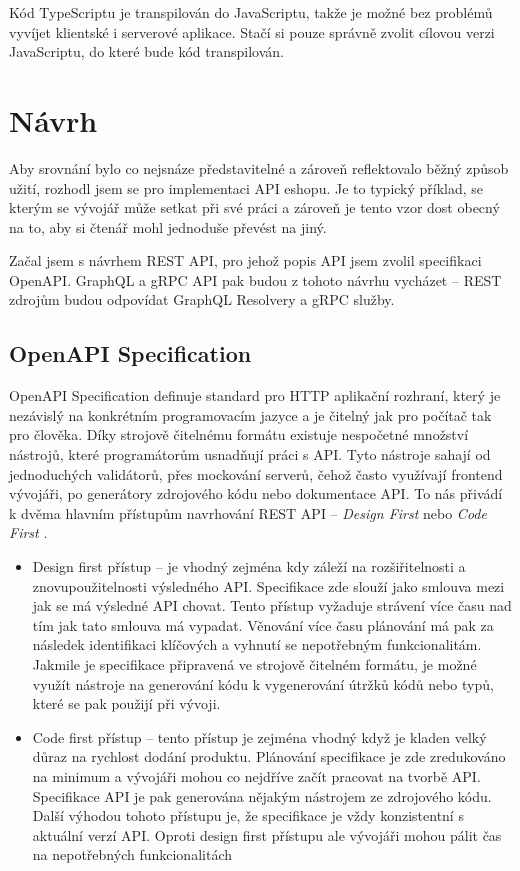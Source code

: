 \documentclass[thesis=M,czech]{FITthesis}[2019/12/23]
\begin{document}
Kód TypeScriptu je transpilován do JavaScriptu, takže je možné bez problémů vyvíjet klientské i serverové aplikace. Stačí si pouze správně zvolit cílovou verzi JavaScriptu, do které bude kód transpilován.

\chapter{Návrh}
Aby srovnání bylo co nejsnáze představitelné a zároveň reflektovalo běžný způsob užití, rozhodl jsem se pro implementaci API eshopu. Je to typický příklad, se kterým se vývojář může setkat při své práci a zároveň je tento vzor dost obecný na to, aby si čtenář mohl jednoduše převést na jiný. 

Začal jsem s návrhem REST API, pro jehož popis API jsem zvolil specifikaci OpenAPI. GraphQL a gRPC API pak budou z tohoto návrhu vycházet -- REST zdrojům budou odpovídat GraphQL Resolvery a gRPC služby.

\section{OpenAPI Specification}
OpenAPI Specification definuje standard pro HTTP aplikační rozhraní, který je nezávislý na konkrétním programovacím jazyce a je čitelný jak pro počítač tak pro člověka.
Díky strojově čitelnému formátu existuje nespočetné množství nástrojů, které programátorům usnadňují práci s API. Tyto nástroje sahají od jednoduchých validátorů, přes mockování serverů, čehož často využívají frontend vývojáři, po generátory zdrojového kódu nebo dokumentace API. To nás přivádí k dvěma hlavním přístupům navrhování REST API -- \textit{Design First} nebo \textit{Code First} \cite{api_design_approach}.

\begin{itemize}
  \item Design first přístup -- je vhodný zejména kdy záleží na rozšiřitelnosti a znovupoužitelnosti výsledného API. Specifikace zde slouží jako smlouva mezi jak se má výsledné API chovat. Tento přístup vyžaduje strávení více času nad tím jak tato smlouva má vypadat. Věnování více času plánování má pak za následek identifikaci klíčových a vyhnutí se nepotřebným funkcionalitám. Jakmile je specifikace připravená ve strojově čitelném formátu, je možné využít nástroje na generování kódu k vygenerování útržků kódů nebo typů, které se pak použijí při vývoji.
  \item Code first přístup -- tento přístup je zejména vhodný když je kladen velký důraz na rychlost dodání produktu. Plánování specifikace je zde zredukováno na minimum a vývojáři mohou co nejdříve začít pracovat na tvorbě API. Specifikace API je pak generována nějakým nástrojem ze zdrojového kódu. Další výhodou tohoto přístupu je, že specifikace je vždy konzistentní s aktuální verzí API. Oproti design first přístupu ale vývojáři mohou pálit čas na nepotřebných funkcionalitách
\end{itemize}
\end{document}
